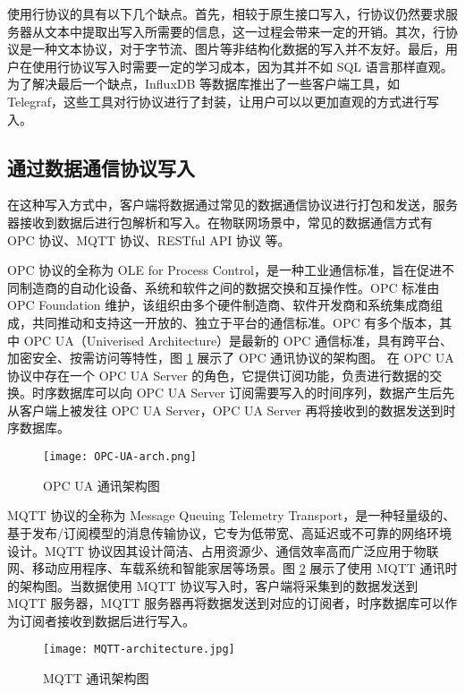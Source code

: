 使用行协议的具有以下几个缺点。首先，相较于原生接口写入，行协议仍然要求服务器从文本中提取出写入所需要的信息，这一过程会带来一定的开销。其次，行协议是一种文本协议，对于字节流、图片等非结构化数据的写入并不友好。最后，用户在使用行协议写入时需要一定的学习成本，因为其并不如 SQL 语言那样直观。为了解决最后一个缺点，InfluxDB 等数据库推出了一些客户端工具，如 Telegraf\cite{influx2024telegraf}，这些工具对行协议进行了封装，让用户可以以更加直观的方式进行写入。

\subsection{通过数据通信协议写入}
在这种写入方式中，客户端将数据通过常见的数据通信协议进行打包和发送，服务器接收到数据后进行包解析和写入。在物联网场景中，常见的数据通信方式有 OPC 协议\cite{zheng2002opc}、MQTT 协议\cite{soni2017survey}、RESTful API 协议\cite{fielding2000architectural} 等。

OPC 协议的全称为 OLE for Process Control，是一种工业通信标准，旨在促进不同制造商的自动化设备、系统和软件之间的数据交换和互操作性。OPC 标准由 OPC Foundation 维护，该组织由多个硬件制造商、软件开发商和系统集成商组成，共同推动和支持这一开放的、独立于平台的通信标准。OPC 有多个版本，其中 OPC UA（Univerised Architecture）是最新的 OPC 通信标准，具有跨平台、加密安全、按需访问等特性\cite{hannelius2008roadmap}，图 \ref{fig:opc-arch} 展示了 OPC 通讯协议的架构图。 在 OPC UA 协议中存在一个 OPC UA Server 的角色，它提供订阅功能，负责进行数据的交换。时序数据库可以向 OPC UA Server 订阅需要写入的时间序列，数据产生后先从客户端上被发往 OPC UA Server，OPC UA Server 再将接收到的数据发送到时序数据库。
\begin{figure}
  \centering
  \texttt{[image: OPC-UA-arch.png]}
  \caption{OPC UA 通讯架构图\cite{leitner2006opc}}
  \label{fig:opc-arch}
\end{figure}


MQTT 协议的全称为 Message Queuing Telemetry Transport，是一种轻量级的、基于发布/订阅模型的消息传输协议，它专为低带宽、高延迟或不可靠的网络环境设计。MQTT 协议因其设计简洁、占用资源少、通信效率高而广泛应用于物联网、移动应用程序、车载系统和智能家居等场景\cite{yassein2017internet}。图 \ref{fig:mqtt-arch} 展示了使用 MQTT 通讯时的架构图。当数据使用 MQTT 协议写入时，客户端将采集到的数据发送到 MQTT 服务器，MQTT 服务器再将数据发送到对应的订阅者，时序数据库可以作为订阅者接收到数据后进行写入。
\begin{figure}
  \centering
  \texttt{[image: MQTT-architecture.jpg]}
  \caption{MQTT 通讯架构图\cite{WLWJ202404039}}
  \label{fig:mqtt-arch}
\end{figure}


